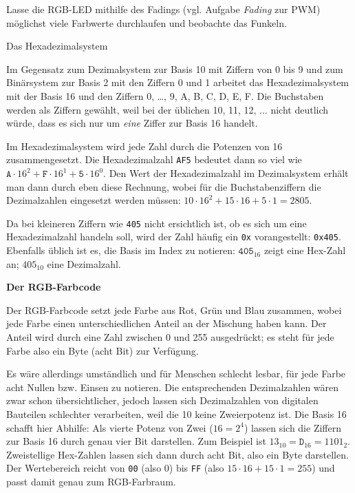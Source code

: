 \begin{projekt}
	Lasse die RGB-LED mithilfe des Fadings (vgl. Aufgabe \emph{Fading} zur PWM) möglichst viele Farbwerte durchlaufen und beobachte das Funkeln.
\end{projekt}
\newpage
{}
\begin{zsfg}{Das Hexadezimalsystem}
	
	Im Gegensatz zum Dezimalsystem zur Basis 10 mit Ziffern von 0 bis 9 und zum Binärsystem zur Basis 2 mit den Ziffern 0 und 1 arbeitet das Hexadezimalsystem mit der Basis 16 und den Ziffern 0, \dots, 9, A, B, C, D, E, F. Die Buchstaben werden als Ziffern gewählt, weil bei der üblichen 10, 11, 12, ... nicht deutlich würde, dass es sich nur um \emph{eine} Ziffer zur Basis 16 handelt.
	
	Im Hexadezimalsystem wird jede Zahl durch die Potenzen von 16 zusammengesetzt. Die Hexadezimalzahl \texttt{AF5} bedeutet dann so viel wie $\texttt{A}\cdot 16^2 + \texttt{F}\cdot 16^1 + \texttt{5}\cdot 16^0$. Den Wert der Hexadezimalzahl im Dezimalsystem erhält man dann durch eben diese Rechnung, wobei für die Buchstabenziffern die Dezimalzahlen eingesetzt werden müssen: $10\cdot 16^2 + 15\cdot 16 + 5\cdot 1 = 2805$.
	
	Da bei kleineren Ziffern wie \texttt{405} nicht ersichtlich ist, ob es sich um eine Hexadezimalzahl handeln soll, wird der Zahl häufig ein \texttt{0x} vorangestellt: \texttt{0x405}. Ebenfalls üblich ist es, die Basis im Index zu notieren: $\texttt{405}_{16}$ zeigt eine Hex-Zahl an; $405_{10}$ eine Dezimalzahl.
	
	\bigskip
	\textbf{Der RGB-Farbcode}
	
	Der RGB-Farbcode setzt jede Farbe aus Rot, Grün und Blau zusammen, wobei jede Farbe einen unterschiedlichen Anteil an der Mischung haben kann. Der Anteil wird durch eine Zahl zwischen 0 und 255 ausgedrückt; es steht für jede Farbe also ein Byte (acht Bit) zur Verfügung.
	
	Es wäre allerdings umständlich und für Menschen schlecht lesbar, für jede Farbe acht Nullen bzw. Einsen zu notieren. Die entsprechenden Dezimalzahlen wären zwar schon übersichtlicher, jedoch lassen sich Dezimalzahlen von digitalen Bauteilen schlechter verarbeiten, weil die 10 keine Zweierpotenz ist. Die Basis 16 schafft hier Abhilfe: Als vierte Potenz von Zwei ($16=2^4$) lassen sich die Ziffern zur Basis 16 durch genau vier Bit darstellen. Zum Beispiel ist $13_{10}=\texttt{D}_{16}=1101_2$. Zweistellige Hex-Zahlen lassen sich dann durch acht Bit, also ein Byte darstellen. Der Wertebereich reicht von \texttt{00} (also 0) bis \texttt{FF} (also $15\cdot 16 + 15 \cdot 1=255$) und passt damit genau zum RGB-Farbraum.
	

\end{zsfg}
